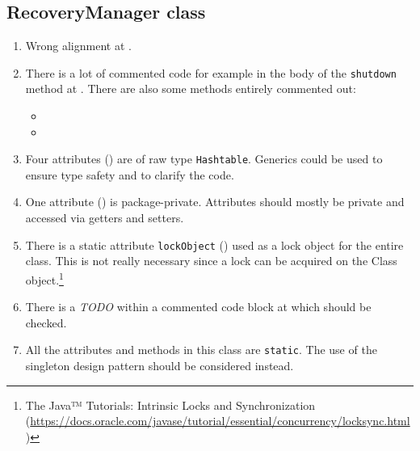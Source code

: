 \subsection{RecoveryManager class}
\label{sec:recoverymanager-class}

\begin{enumerate}
    \item {} Wrong alignment at .
	\item {} There is a lot of commented code for example in the body of the \texttt{shutdown} method at . There are also some methods entirely commented out:
	\begin{itemize}
		\item {}
		\item {}
	\end{itemize}
	\item {} Four attributes () are of raw type \texttt{Hashtable}. Generics could be used to ensure type safety and to clarify the code.
    \item {} One attribute () is package-private. Attributes should mostly be private and accessed via getters and setters.
    \item There is a static attribute \texttt{lockObject} () used as a lock object for the entire class. This is not really necessary since a lock can be acquired on the Class object.\footnote{The Java™ Tutorials: Intrinsic Locks and Synchronization (\url{https://docs.oracle.com/javase/tutorial/essential/concurrency/locksync.html})}
    \item There is a \emph{TODO} within a commented code block at  which should be checked.
    \item All the attributes and methods in this class are \texttt{static}. The use of the singleton design pattern should be considered instead.
\end{enumerate}

